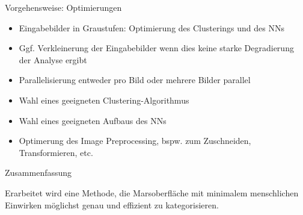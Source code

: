 \documentclass[9pt]{beamer}
\begin{document}
\begin{frame}{Vorgehensweise: Optimierungen}
	\begin{itemize}
		\item Eingabebilder in Graustufen: Optimierung des Clusterings und des NNs
		\item Ggf. Verkleinerung der Eingabebilder wenn dies keine starke Degradierung der Analyse ergibt
		\item Parallelisierung entweder pro Bild oder mehrere Bilder parallel
		\item Wahl eines geeigneten Clustering-Algorithmus
		\item Wahl eines geeigneten Aufbaus des NNs
		\item Optimerung des Image Preprocessing, bspw. zum Zuschneiden, Transformieren, etc.
	\end{itemize}
\end{frame}

\begin{frame}{Zusammenfassung}
	\begin{center}
		Erarbeitet wird eine Methode, die Marsoberfläche mit minimalem menschlichen Einwirken möglichst genau und effizient zu kategorisieren.
	\end{center}
\end{frame}
\end{document}
